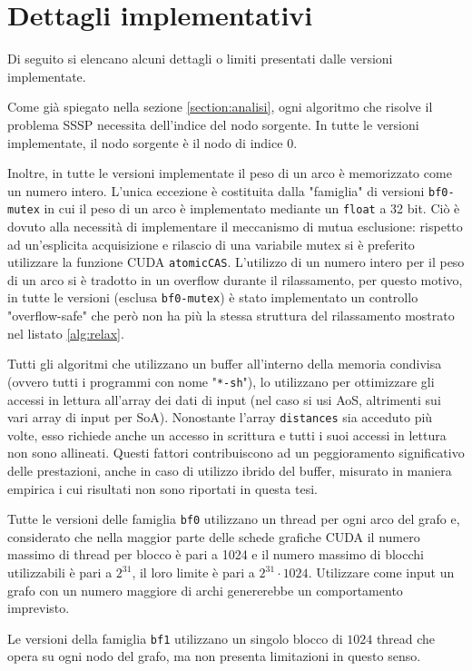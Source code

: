 \documentclass[12pt,a4paper]{book}
\begin{document}
	\section{Dettagli implementativi}
	\label{section:impl}
	Di seguito si elencano alcuni dettagli o limiti presentati dalle versioni implementate.
	
	Come già spiegato nella sezione \ref{section:analisi}, ogni algoritmo che risolve il problema SSSP necessita dell'indice del nodo sorgente. In tutte le versioni implementate, il nodo sorgente è il nodo di indice $0$.
	
	Inoltre, in tutte le versioni implementate il peso di un arco è memorizzato come un numero intero. L'unica eccezione è costituita dalla "famiglia" di versioni \texttt{bf0-mutex} in cui il peso di un arco è implementato mediante un \texttt{float} a 32 bit. Ciò è dovuto alla necessità di implementare il meccanismo di mutua esclusione: rispetto ad un'esplicita acquisizione e rilascio di una variabile mutex si è preferito utilizzare la funzione CUDA \texttt{atomicCAS}. L'utilizzo di un numero intero per il peso di un arco si è tradotto in un overflow durante il rilassamento, per questo motivo, in tutte le versioni (esclusa \texttt{bf0-mutex}) è stato implementato un controllo "overflow-safe" che però non ha più la stessa struttura del rilassamento mostrato nel listato \ref{alg:relax}.

	Tutti gli algoritmi che utilizzano un buffer all'interno della memoria condivisa (ovvero tutti i programmi con nome "\texttt{*-sh}"), lo utilizzano per ottimizzare gli accessi in lettura all'array dei dati di input (nel caso si usi AoS, altrimenti sui vari array di input per SoA). Nonostante l'array \texttt{distances} sia acceduto più volte, esso richiede anche un accesso in scrittura e tutti i suoi accessi in lettura non sono allineati. Questi fattori contribuiscono ad un peggioramento significativo delle prestazioni, anche in caso di utilizzo ibrido del buffer, misurato in maniera empirica i cui risultati non sono riportati in questa tesi.
	
	Tutte le versioni delle famiglia \texttt{bf0} utilizzano un thread per ogni arco del grafo e, considerato che nella maggior parte delle schede grafiche CUDA il numero massimo di thread per blocco è pari a 1024 e il numero massimo di blocchi utilizzabili è pari a $2^{31}$, il loro limite è pari a $2^{31}\cdot 1024$. Utilizzare come input un grafo con un numero maggiore di archi genererebbe un comportamento imprevisto.
	
	Le versioni della famiglia \texttt{bf1} utilizzano un singolo blocco di $1024$ thread che opera su ogni nodo del grafo, ma non presenta limitazioni in questo senso.
	
\end{document}
